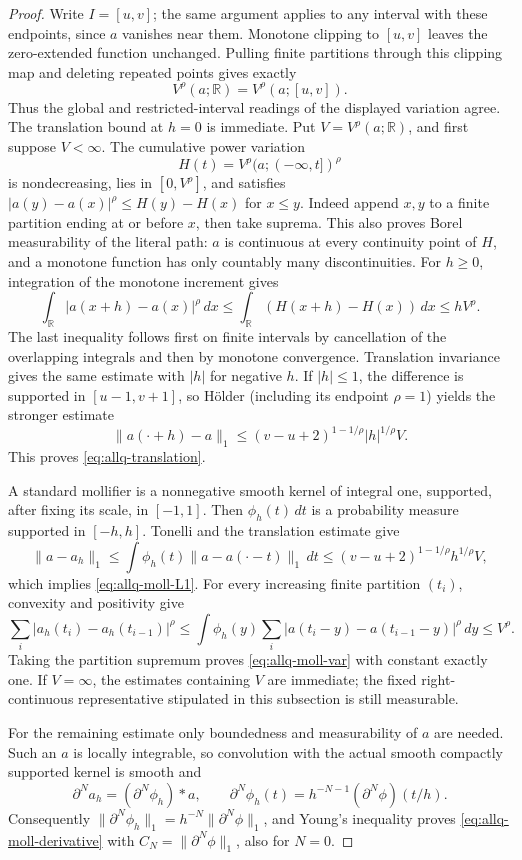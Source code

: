 \documentclass[11pt]{article}
\numberwithin{equation}{section}
\theoremstyle{remark}
\theoremstyle{definition}
\begin{document}
\begin{proof}
Write $I=[u,v]$; the same argument applies to any interval with these
endpoints, since $a$ vanishes near them.  Monotone clipping to $[u,v]$
leaves the zero-extended function unchanged.  Pulling finite partitions
through this clipping map and deleting repeated points gives exactly
\[
 V^\rho(a;\mathbb R)=V^\rho(a;[u,v]).
\]
Thus the global and restricted-interval readings of the displayed
variation agree.  The translation bound at $h=0$ is immediate.  Put
$V=V^\rho(a;\mathbb R)$, and first suppose $V<\infty$.
The cumulative power variation
\[
 H(t)=V^\rho(a;(-\infty,t])^\rho
\]
is nondecreasing, lies in $[0,V^\rho]$, and satisfies
$|a(y)-a(x)|^\rho\le H(y)-H(x)$ for $x\le y$.
Indeed append $x,y$ to a finite partition ending at or before $x$, then
take suprema.  This also proves Borel measurability of the literal path:
$a$ is continuous at every continuity point of $H$, and a monotone
function has only countably many discontinuities.
For $h\ge0$, integration of the monotone increment gives
\[
 \int_{\mathbb R}|a(x+h)-a(x)|^\rho\,dx
 \le\int_{\mathbb R}(H(x+h)-H(x))\,dx\le hV^\rho.
\]
The last inequality follows first on finite intervals by cancellation of
the overlapping integrals and then by monotone convergence.  Translation
invariance gives the same estimate with $|h|$ for negative $h$.
If $|h|\le1$, the difference is supported in $[u-1,v+1]$, so H\"older
(including its endpoint $\rho=1$) yields the stronger estimate
\[
 \|a(\cdot+h)-a\|_1
 \le(v-u+2)^{1-1/\rho}|h|^{1/\rho}V.
\]
This proves \eqref{eq:allq-translation}.

A standard mollifier is a nonnegative smooth kernel of integral one,
supported, after fixing its scale, in $[-1,1]$.
Then $\phi_h(t)\,dt$ is a probability measure supported in $[-h,h]$.
Tonelli and the translation estimate give
\[
 \|a-a_h\|_1
 \le\int\phi_h(t)\|a-a(\cdot-t)\|_1\,dt
 \le(v-u+2)^{1-1/\rho}h^{1/\rho}V,
\]
which implies \eqref{eq:allq-moll-L1}.  For every increasing finite
partition $(t_i)$, convexity and positivity give
\[
 \sum_i|a_h(t_i)-a_h(t_{i-1})|^\rho
 \le\int\phi_h(y)\sum_i|a(t_i-y)-a(t_{i-1}-y)|^\rho\,dy
 \le V^\rho.
\]
Taking the partition supremum proves \eqref{eq:allq-moll-var} with
constant exactly one.  If $V=\infty$, the estimates containing $V$ are
immediate; the fixed right-continuous representative stipulated in this
subsection is still measurable.

For the remaining estimate only boundedness and measurability of $a$ are
needed.  Such an $a$ is locally integrable, so convolution with the actual
smooth compactly supported kernel is smooth and
\[
 \partial^Na_h=(\partial^N\phi_h)*a,\qquad
 \partial^N\phi_h(t)=h^{-N-1}(\partial^N\phi)(t/h).
\]
Consequently $\|\partial^N\phi_h\|_1=h^{-N}\|\partial^N\phi\|_1$, and
Young's inequality proves \eqref{eq:allq-moll-derivative} with
$C_N=\|\partial^N\phi\|_1$, also for $N=0$.
\end{proof}
\end{document}
